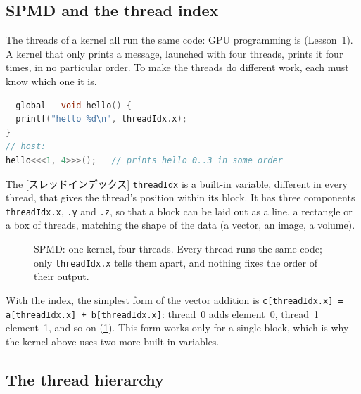 \documentclass[../main.tex]{subfiles}
\begin{document}
\subsection{SPMD and the thread index}

The threads of a kernel all run the same code: GPU programming is
 (Lesson~1).  A kernel that only prints a message, launched
with four threads, prints it four times, in no particular order.  To make
the threads do different work, each must know which one it is.
\begin{lstlisting}[language=C++, numbers=none]
__global__ void hello() {
  printf("hello %d\n", threadIdx.x);
}
// host:
hello<<<1, 4>>>();   // prints hello 0..3 in some order
\end{lstlisting}

\begin{definition}
  The [スレッドインデックス] \texttt{threadIdx} is a
  built-in variable, different in every thread, that gives the thread's
  position within its block.  It has three components
  \texttt{threadIdx.x}, \texttt{.y} and \texttt{.z}, so that a block can
  be laid out as a line, a rectangle or a box of threads, matching the
  shape of the data (a vector, an image, a volume).
\end{definition}

\begin{figure}[tb]
  \centering
  
  \caption{SPMD: one kernel, four threads.  Every thread runs the same
    code; only \texttt{threadIdx.x} tells them apart, and nothing fixes
    the order of their output.}
  \label{fig:l03-spmd}
\end{figure}

With the index, the simplest form of the vector addition is
\texttt{c[threadIdx.x] = a[threadIdx.x] + b[threadIdx.x]}: thread~0 adds
element~0, thread~1 element~1, and so on (\cref{fig:l03-spmd}).  This form
works only for a single block, which is why the kernel above uses two more
built-in variables.

\subsection{The thread hierarchy}
\end{document}
